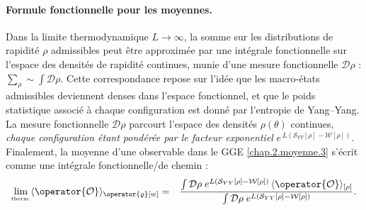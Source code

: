 \paragraph{Formule fonctionnelle pour les moyennes.}

Dans la limite thermodynamique $L \to \infty$, la somme sur les distributions de rapidité $\rho$ admissibles peut être approximée par une intégrale fonctionnelle sur l’espace des densités de rapidité continues, munie d’une mesure fonctionnelle $\mathcal{D}\rho$ : 
\(
\sum_{\rho } \sim \int \mathcal{D} \rho .
\)
Cette correspondance repose sur l’idée que les macro-états admissibles deviennent denses dans l’espace fonctionnel, et que le poids statistique associé à chaque configuration est donné par l’entropie de Yang–Yang.
La mesure fonctionnelle $\mathcal{D}\rho$ parcourt l’espace des densités
$\rho(\theta)$ continues, \emph{chaque configuration étant pondérée par le
facteur exponentiel}
\(
e^{\,L(\mathcal{S}_{YY}[\rho]-\mathcal{W}[\rho])}.
\)
Finalement, la moyenne d'une observable dans le \gls{GGE} \eqref{chap.2.moyenne.3} s’écrit comme une intégrale fonctionnelle/de chemin :
\begin{eqnarray}
	\underset{\mbox{\tiny therm.}}{\lim} \langle \operator{\mathcal{O}} \rangle_{\operator{\varrho}[w]} & = & \frac{\int \mathcal{D} \rho \; e^{L (\mathcal{S}_{YY}[\rho] - \mathcal{W}[\rho])} \, \langle\operator{\mathcal{O}}\rangle_{[\rho]}}{\int \mathcal{D} \rho \; e^{L (\mathcal{S}_{YY}[\rho] - \mathcal{W}[\rho])}}. \label{chap:TBA:eq:ensemble_average}
\end{eqnarray}



